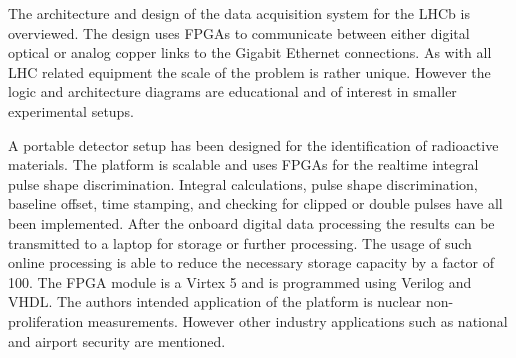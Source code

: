 \documentclass[12pt]{article}
\begin{document}
\begin{doublespacing}
{\large\textbf{\cite{Haefeli2006119}}}
The architecture and design of the data acquisition system for the LHCb is overviewed.
The design uses FPGAs to communicate between either digital optical or analog copper links to the Gigabit Ethernet connections.
As with all LHC related equipment the scale of the problem is rather unique.
However the logic and architecture diagrams are educational and of interest in smaller experimental setups.


{\large\textbf{\cite{Schiffer2011491}}}
A portable detector setup has been designed for the identification of radioactive materials.
The platform is scalable and uses FPGAs for the realtime integral pulse shape discrimination.
Integral calculations, pulse shape discrimination, baseline offset, time stamping, and checking for clipped or double pulses have all been implemented.
After the onboard digital data processing the results can be transmitted to a laptop for storage or further processing.
The usage of such online processing is able to reduce the necessary storage capacity by a factor of 100. The FPGA module is a Virtex 5 and is programmed using Verilog and VHDL.
The authors intended application of the platform is nuclear non-proliferation measurements.
However other industry applications such as national and airport security are mentioned.
\\[20pt]


\end{doublespacing}



\end{document}
